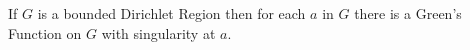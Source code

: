 If $G$ is a bounded Dirichlet Region then for each $a$ in $G$ there is a Green's Function on $G$ with singularity at $a$.
